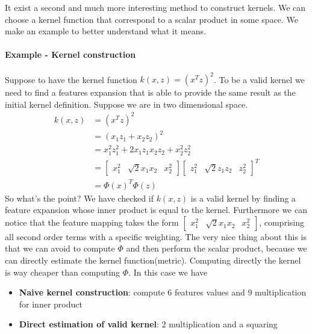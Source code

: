 \documentclass[../main.tex]{subfiles}
\begin{document}
It exist a second and much more interesting method to construct kernels. We can choose a kernel function that correspond to a scalar product in some space. We make an example to better understand what it means.
\paragraph{Example - Kernel construction}Suppose to have the kernel function $k(x, z) = (x^T z)^2$.
To be a valid kernel we need to find a features expansion that is able to provide the same result as the initial kernel definition. Suppose we are in two dimensional space.
\begin{align*}
    k(x,z) & = (x^T z)^2                                                                                                                \\
           & = (x_1z_1 + x_2z_2)^2                                                                                                      \\
           & = x_1^2z_1^2 + 2x_1z_1x_2z_2 + x_2^2z_2^2                                                                                  \\
           & = \begin{bmatrix} x_1^2 & \sqrt{2}x_1x_2 & x_2^2\end{bmatrix}\begin{bmatrix} z_1^2 & \sqrt{2}z_1z_2 & z_2^2\end{bmatrix}^T \\
           & = \Phi(x)^T \Phi(z)
\end{align*}
So what's the point? We have checked if $k(x,z)$ is a valid kernel by finding a feature expansion whose inner product is equal to the kernel. Furthermore we can notice that the feature mapping takes the form $\begin{bmatrix} x_1^2 & \sqrt{2}x_1x_2 & x_2^2\end{bmatrix}$, comprising all second order terms with a specific weighting. The very nice thing about this is that we can avoid to compute $\Phi$ and then perform the scalar product, because we can directly estimate the kernel function(metric). Computing directly the kernel is way cheaper than computing $\Phi$.
In this case we have
\begin{itemize}
    \item \textbf{Naive kernel construction}: compute 6 features values and 9 multiplication for inner product
    \item \textbf{Direct estimation of valid kernel}: 2 multiplication and a squaring
\end{itemize}
\end{document}
